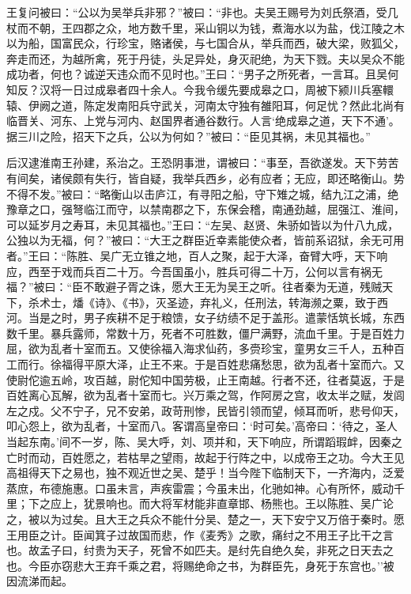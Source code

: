 \documentclass[]{article}
\begin{document}
王复问被曰：``公以为吴举兵非邪？''被曰：``非也。夫吴王赐号为刘氏祭酒，受几杖而不朝，王四郡之众，地方数千里，采山铜以为钱，煮海水以为盐，伐江陵之木以为船，国富民众，行珍宝，赂诸侯，与七国合从，举兵而西，破大梁，败狐父，奔走而还，为越所禽，死于丹徒，头足异处，身灭祀绝，为天下戮。夫以吴众不能成功者，何也？诚逆天违众而不见时也。''王曰：``男子之所死者，一言耳。且吴何知反？汉将一日过成皋者四十余人。今我令缓先要成皋之口，周被下颍川兵塞轘辕、伊阙之道，陈定发南阳兵守武关，河南太守独有雒阳耳，何足忧？然此北尚有临晋关、河东、上党与河内、赵国界者通谷数行。人言`绝成皋之道，天下不通'。据三川之险，招天下之兵，公以为何如？''被曰：``臣见其祸，未见其福也。''

后汉逮淮南王孙建，系治之。王恐阴事泄，谓被曰：``事至，吾欲遂发。天下劳苦有间矣，诸侯颇有失行，皆自疑，我举兵西乡，必有应者；无应，即还略衡山。势不得不发。''被曰：``略衡山以击庐江，有寻阳之船，守下雉之城，结九江之浦，绝豫章之口，强弩临江而守，以禁南郡之下，东保会稽，南通劲越，屈强江、淮间，可以延岁月之寿耳，未见其福也。''王曰：``左吴、赵贤、朱骄如皆以为什八九成，公独以为无福，何？''被曰：``大王之群臣近幸素能使众者，皆前系诏狱，余无可用者。''王曰：``陈胜、吴广无立锥之地，百人之聚，起于大泽，奋臂大呼，天下响应，西至于戏而兵百二十万。今吾国虽小，胜兵可得二十万，公何以言有祸无福？''被曰：``臣不敢避子胥之诛，愿大王无为吴王之听。往者秦为无道，残贼天下，杀术士，燔《诗》、《书》，灭圣迹，弃礼义，任刑法，转海濒之粟，致于西河。当是之时，男子疾耕不足于粮馈，女子纺绩不足于盖形。遣蒙恬筑长城，东西数千里。暴兵露师，常数十万，死者不可胜数，僵尸满野，流血千里。于是百姓力屈，欲为乱者十室而五。又使徐福入海求仙药，多赍珍宝，童男女三千人，五种百工而行。徐福得平原大泽，止王不来。于是百姓悲痛愁思，欲为乱者十室而六。又使尉佗逾五岭，攻百越，尉佗知中国劳极，止王南越。行者不还，往者莫返，于是百姓离心瓦解，欲为乱者十室而七。兴万乘之驾，作阿房之宫，收太半之赋，发闾左之戍。父不宁子，兄不安弟，政苛刑惨，民皆引领而望，倾耳而听，悲号仰天，叩心怨上，欲为乱者，十室而八。客谓高皇帝曰：`时可矣。'高帝曰：`待之，圣人当起东南。'间不一岁，陈、吴大呼，刘、项并和，天下响应，所谓蹈瑕衅，因秦之亡时而动，百姓愿之，若枯旱之望雨，故起于行阵之中，以成帝王之功。今大王见高祖得天下之易也，独不观近世之吴、楚乎！当今陛下临制天下，一齐海内，泛爱蒸庶，布德施惠。口虽未言，声疾雷震；今虽未出，化驰如神。心有所怀，威动千里；下之应上，犹景响也。而大将军材能非直章邯、杨熊也。王以陈胜、吴广论之，被以为过矣。且大王之兵众不能什分吴、楚之一，天下安宁又万倍于秦时。愿王用臣之计。臣闻箕子过故国而悲，作《麦秀》之歌，痛纣之不用王子比干之言也。故孟子曰，纣贵为天子，死曾不如匹夫。是纣先自绝久矣，非死之日天去之也。今臣亦窃悲大王弃千乘之君，将赐绝命之书，为群臣先，身死于东宫也。''被因流涕而起。
\end{document}
